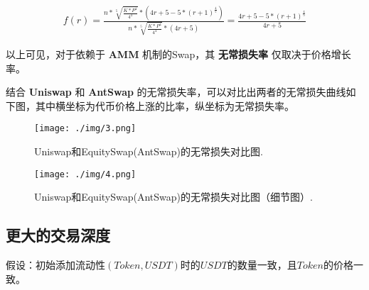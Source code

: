 \documentclass{article}
\begin{document}
\begin{equation} \label{antswap_impermanent_loss_rate}
\begin{split}
f(r) = \frac{n * \sqrt[5]{\frac{K * P^4}{4^4}} * (4r + 5 - 5 * (r + 1)^\frac{4}{5})}{n * \sqrt[5]{\frac{K * P^4}{4 ^4}} * (4r + 5)} = \frac{4r + 5 - 5 * (r + 1)^\frac{4}{5}} {4r + 5}
\end{split}
\end{equation}

以上可见，对于依赖于 \textbf{AMM} 机制的Swap，其 \textbf{无常损失率} 仅取决于价格增长率。

结合 \textbf{Uniswap} 和 \textbf{AntSwap} 的无常损失率，可以对比出两者的无常损失曲线如下图，其中横坐标为代币价格上涨的比率，纵坐标为无常损失率。

\begin{figure}[H]
\centering
\texttt{[image: ./img/3.png]}
\caption{\label{fig}Uniswap和EquitySwap(AntSwap)的无常损失对比图.}
\end{figure}

\begin{figure}[H]
\centering
\texttt{[image: ./img/4.png]}
\caption{\label{fig} Uniswap和EquitySwap(AntSwap)的无常损失对比图（细节图）.}
\end{figure}

\subsection{更大的交易深度}

假设：初始添加流动性$(Token, USDT)$时的$USDT$的数量一致，且$Token$的价格一致。







\end{document}
